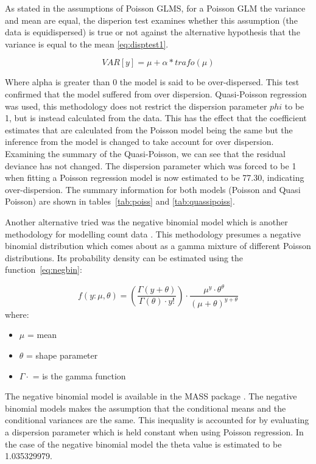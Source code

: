 As stated in the assumptions of Poisson GLMS, for a Poisson GLM the variance and mean are equal, the disperion test \citep{AerRPack} examines whether this assumption (the data is equidispersed) is true or not against the alternative hypothesis  that the variance is equal to the mean \ref{eq:disptest1}.

\begin{equation} VAR[y] = \mu + \alpha * trafo(\mu)   \label{eq:disptest1}  \end{equation}

Where alpha is greater than 0 the model is said to be over-dispersed. This test confirmed that the  model suffered from over dispersion.  Quasi-Poisson regression was used, this methodology does not restrict the dispersion parameter $phi$ to be 1, but is instead  calculated from the data. This has the effect that the coefficient estimates that are calculated from the Poisson model being the same  but the inference from the model is  changed to take account for over dispersion. Examining the summary of the Quasi-Poisson, we can see that the residual deviance has not changed. The dispersion parameter which was forced to be 1 when fitting a Poisson regression model is now estimated to be 77.30, indicating over-dispersion. The summary information for both models (Poisson and Quasi Poisson) are shown in tables~\ref{tab:poiss} and \ref{tab:quassipoiss}. 

Another alternative tried was the negative binomial model which is another methodology for modelling count data \citep{ver2007quasi}. This methodology presumes a negative binomial distribution which comes about as a gamma mixture of different Poisson distributions. Its probability density can be estimated using the function~\ref{eq:negbin}:

\begin{equation}  f(y:\mu,\theta)=  (\frac{\Gamma(y+\theta)}{\Gamma(\theta)\cdot y!})\cdot \frac{\mu^y\cdot \theta^\theta}{(\mu+\theta)^{y+\theta}}  \label{eq:negbin}  \end{equation}
where:
\begin{itemize}
\item[] $\mu$ =  mean
\item[] $\theta$ = shape parameter
\item[] $\Gamma\cdot$ = is the gamma function
\end{itemize}

The negative binomial model is available in the MASS package \citep{venables2002random}. The negative binomial models makes the assumption that the conditional means and the conditional variances are the same. This inequality is accounted for by evaluating a dispersion parameter which is held constant when using Poisson regression. In the case of the negative binomial model the theta value is estimated to be 1.035329979.

